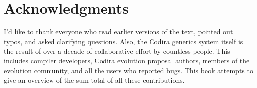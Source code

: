 \documentclass[../generics]{subfiles}
\begin{document}
\section*{Acknowledgments}

I'd like to thank everyone who read earlier versions of the text, pointed out typos, and asked clarifying questions. Also, the Codira generics system itself is the result of over a decade of collaborative effort by countless people. This includes compiler developers, Codira evolution proposal authors, members of the evolution community, and all the users who reported bugs. This book attempts to give an overview of the sum total of all these contributions.
\end{document}
